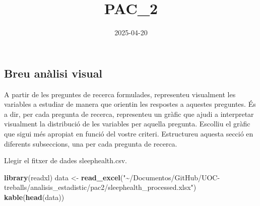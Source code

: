 \documentclass[
]{article}
\title{PAC\_2}
\author{}
\date{\vspace{-2.5em}2025-04-20}
\newenvironment{Shaded}{\begin{snugshade}}{\end{snugshade}}
\newcommand{\FunctionTok}[1]{\textcolor[rgb]{0.13,0.29,0.53}{\textbf{#1}}}
\newcommand{\NormalTok}[1]{#1}
\newcommand{\OtherTok}[1]{\textcolor[rgb]{0.56,0.35,0.01}{#1}}
\newcommand{\StringTok}[1]{\textcolor[rgb]{0.31,0.60,0.02}{#1}}
\begin{document}
\maketitle

\subsection{Breu anàlisi visual}\label{breu-anuxe0lisi-visual}

A partir de les preguntes de recerca formulades, representeu visualment
les variables a estudiar de manera que orientin les respostes a aquestes
preguntes. És a dir, per cada pregunta de recerca, representeu un gràfic
que ajudi a interpretar visualment la distribució de les variables per
aquella pregunta. Escolliu el gràfic que sigui més apropiat en funció
del vostre criteri. Estructureu aquesta secció en diferents subseccions,
una per cada pregunta de recerca.

{Llegir el fitxer de dades sleephealth.csv.}

\begin{Shaded}
\begin{Highlighting}[]
\FunctionTok{library}\NormalTok{(readxl)}
\NormalTok{data }\OtherTok{\textless{}{-}} \FunctionTok{read\_excel}\NormalTok{(}\StringTok{"\textasciitilde{}/Documentos/GitHub/UOC{-}treballs/analisis\_estadistic/pac2/sleephealth\_processed.xlsx"}\NormalTok{)}
\FunctionTok{kable}\NormalTok{(}\FunctionTok{head}\NormalTok{(data))}
\end{Highlighting}
\end{Shaded}
\end{document}
